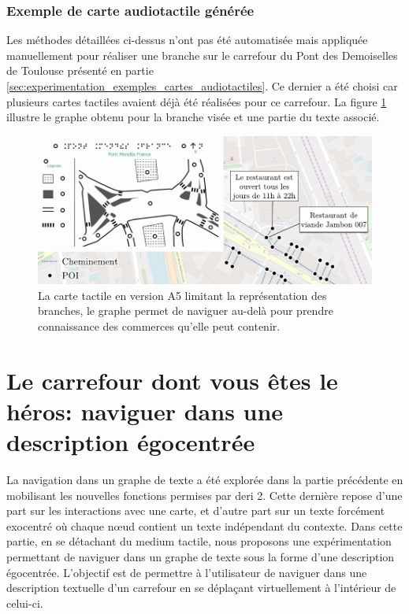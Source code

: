 \subsubsection{Exemple de carte audiotactile générée}

Les méthodes détaillées ci-dessus n'ont pas été automatisée mais appliquée manuellement pour réaliser une branche sur le carrefour du Pont des Demoiselles de Toulouse présenté en partie \ref{sec:experimentation_exemples_cartes_audiotactiles}. Ce dernier a été choisi car plusieurs cartes tactiles avaient déjà été réalisées pour ce carrefour. La figure \ref{fig:experimentation_deri2_exemple_carte} illustre le graphe obtenu pour la branche visée et une partie du texte associé. 

\begin{figure}[ht]
    \centering
    \includegraphics[width=\textwidth]{images/experimentation/exemple_poc2.pdf}
    \caption[Carte tactile A5 et graphe de description de branche]{La carte tactile en version A5 limitant la représentation des branches, le graphe permet de naviguer au-delà pour prendre connaissance des commerces qu'elle peut contenir.}
    \label{fig:experimentation_deri2_exemple_carte}
\end{figure}

\section{Le carrefour dont vous êtes le héros: naviguer dans une description égocentrée}

\label{sec:experimentation_le_carrefour_dont_vous_etes_le_heros}

La navigation dans un graphe de texte a été explorée dans la partie précédente en mobilisant les nouvelles fonctions permises par \gls{deri} 2. Cette dernière repose d'une part sur les interactions avec une carte, et d'autre part sur un texte forcément exocentré où chaque nœud contient un texte indépendant du contexte. Dans cette partie, en se détachant du medium tactile, nous proposons une expérimentation permettant de naviguer dans un graphe de texte sous la forme d'une description égocentrée. L'objectif est de permettre à l'utilisateur de naviguer dans une description textuelle d'un carrefour en se déplaçant virtuellement à l'intérieur de celui-ci. 

